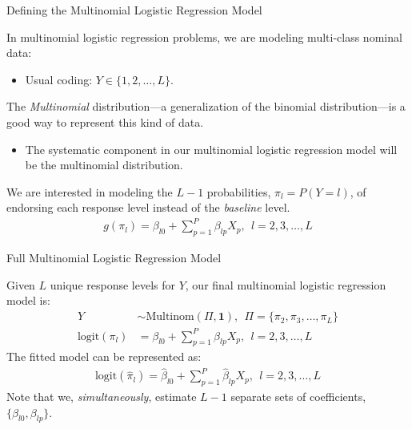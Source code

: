 \documentclass{beamer}\usepackage[]{graphicx}\usepackage[]{color}
\begin{document}
\begin{frame}{Defining the Multinomial Logistic Regression Model}
  
  In multinomial logistic regression problems, we are modeling multi-class 
  nominal data:
  \begin{itemize}
  \item Usual coding: $Y \in \{1, 2, \ldots, L\}$.
  \end{itemize}
  \vb
  The \emph{Multinomial} distribution---a generalization of the binomial 
  distribution---is a good way to represent this kind of data.
  \begin{itemize}
  \item The systematic component in our multinomial logistic regression model 
    will be the multinomial distribution.
  \end{itemize}
  \vb
  We are interested in modeling the $L - 1$ probabilities, $\pi_l = P(Y = l)$, 
  of endorsing each response level instead of the \emph{baseline} level.
  \begin{align*}
    g(\pi_l) = \beta_{l0} + \sum_{p = 1}^P \beta_{lp} X_p, ~~ l = 2, 3, \ldots, L
  \end{align*}

\end{frame}


\begin{frame}{Full Multinomial Logistic Regression Model}
  
  Given $L$ unique response levels for $Y$, our final multinomial logistic 
  regression model is:
  \begin{align*}
    Y &\sim \text{Multinom}(\Pi, \mathbf{1}), ~~ \Pi = \{\pi_2, \pi_3, \ldots, 
    \pi_L\}\\
    \text{logit}(\pi_l) &= \beta_{l0} + \sum_{p = 1}^P \beta_{lp} X_p, ~~ l = 2, 3,
    \ldots, L
  \end{align*}
  The fitted model can be represented as:
  \begin{align*}
    \text{logit}(\hat{\pi}_l) = \hat{\beta}_{l0} + \sum_{p = 1}^P \hat{\beta}_{lp} 
    X_p, ~~ l = 2, 3, \ldots, L
  \end{align*}
  Note that we, \emph{simultaneously}, estimate $L - 1$ separate sets of 
  coefficients, $\{\beta_{l0}, \beta_{lp}\}$.   
  
\end{frame}

\end{document}
